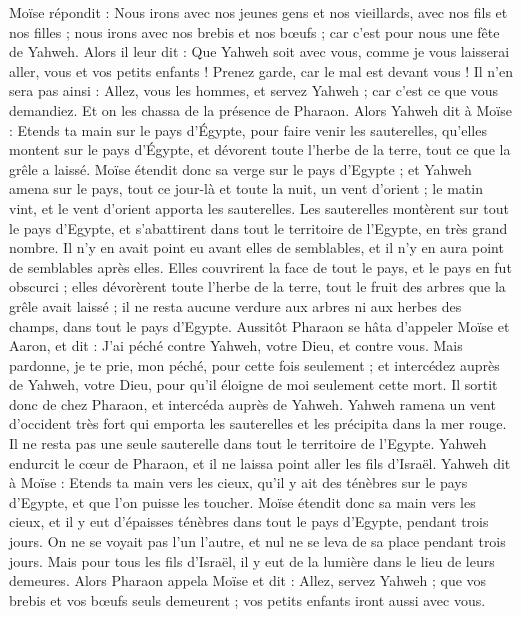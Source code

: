 \begin{multicols}{2}
Moïse répondit : Nous irons avec nos jeunes gens et nos vieillards, avec nos fils et nos filles ; nous irons avec nos brebis et nos bœufs ; car c'est pour nous une fête de Yahweh.
Alors il leur dit : Que Yahweh soit avec vous, comme je vous laisserai aller, vous et vos petits enfants ! Prenez garde, car le mal est devant vous !
Il n'en sera pas ainsi : Allez, vous les hommes, et servez Yahweh ; car c'est ce que vous demandiez. Et on les chassa de la présence de Pharaon.
Alors Yahweh dit à Moïse : Etends ta main sur le pays d'Égypte, pour faire venir les sauterelles, qu'elles montent sur le pays d'Égypte, et dévorent toute l'herbe de la terre, tout ce que la grêle a laissé.
Moïse étendit donc sa verge sur le pays d'Egypte ; et Yahweh amena sur le pays, tout ce jour-là et toute la nuit, un vent d'orient ; le matin vint, et le vent d'orient apporta les sauterelles.
Les sauterelles montèrent sur tout le pays d'Egypte, et s'abattirent dans tout le territoire de l'Egypte, en très grand nombre. Il n'y en avait point eu avant elles de semblables, et il n'y en aura point de semblables après elles.
Elles couvrirent la face de tout le pays, et le pays en fut obscurci ; elles dévorèrent toute l'herbe de la terre, tout le fruit des arbres que la grêle avait laissé ; il ne resta aucune verdure aux arbres ni aux herbes des champs, dans tout le pays d'Egypte.
Aussitôt Pharaon se hâta d'appeler Moïse et Aaron, et dit : J'ai péché contre Yahweh, votre Dieu, et contre vous.
Mais pardonne, je te prie, mon péché, pour cette fois seulement ; et intercédez auprès de Yahweh, votre Dieu, pour qu'il éloigne de moi seulement cette mort.
Il sortit donc de chez Pharaon, et intercéda auprès de Yahweh.
Yahweh ramena un vent d'occident très fort qui emporta les sauterelles et les précipita dans la mer rouge. Il ne resta pas une seule sauterelle dans tout le territoire de l'Egypte.
Yahweh endurcit le cœur de Pharaon, et il ne laissa point aller les fils d'Israël.
Yahweh dit à Moïse : Etends ta main vers les cieux, qu'il y ait des ténèbres sur le pays d'Egypte, et que l’on puisse les toucher.
Moïse étendit donc sa main vers les cieux, et il y eut d'épaisses ténèbres dans tout le pays d'Egypte, pendant trois jours\FTNT{}.
On ne se voyait pas l'un l'autre, et nul ne se leva de sa place pendant trois jours. Mais pour tous les fils d'Israël, il y eut de la lumière dans le lieu de leurs demeures.
Alors Pharaon appela Moïse et dit : Allez, servez Yahweh ; que vos brebis et vos bœufs seuls demeurent ; vos petits enfants iront aussi avec vous.

\end{multicols}
